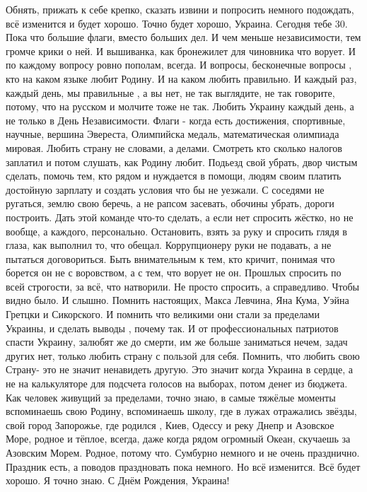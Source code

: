 \obeycr
Обнять, прижать к себе крепко, сказать извини и попросить немного подождать, всё изменится и будет хорошо. 
Точно будет хорошо, Украина. 
Сегодня тебе 30. 
Пока что большие флаги, вместо больших дел.
И чем меньше независимости, тем громче крики о ней. 
И вышиванка, как бронежилет для чиновника что ворует. 
И по каждому вопросу ровно пополам, всегда. 
И вопросы, бесконечные вопросы , кто на каком языке любит Родину. 
И на каком любить правильно. 
И каждый раз, каждый день, мы правильные , а вы нет, не так выглядите, не так говорите, потому, что на русском и молчите тоже не так. 
Любить Украину каждый день, а не только в День Независимости. 
Флаги - когда есть достижения, спортивные, научные, вершина Эвереста, Олимпийска медаль, математическая олимпиада мировая. 
Любить страну не словами, а делами. 
Смотреть кто сколько налогов заплатил и потом слушать, как Родину любит. 
Подьезд свой убрать, двор чистым сделать, помочь тем, кто рядом и нуждается в помощи, людям своим платить достойную зарплату и создать условия что бы не уезжали. 
С соседями не ругаться, землю свою беречь, а не рапсом засевать, обочины убрать, дороги построить. 
Дать этой команде что-то сделать, а если нет спросить жёстко, но не вообще, а каждого, персонально. 
Остановить, взять за руку и спросить глядя в глаза, как выполнил то, что обещал. 
Коррупционеру руки не подавать, а не пытаться договориться. 
Быть внимательным к тем, кто кричит, понимая что борется он не с воровством, а с тем, что ворует не он. 
Прошлых спросить по всей строгости, за всё, что натворили. 
Не просто спросить, а справедливо. Чтобы видно было. И слышно. 
Помнить настоящих, Макса Левчина, Яна Кума, Уэйна Гретцки и Сикорского. 
И помнить что великими они стали за пределами Украины, и сделать выводы , почему так. 
И от профессиональных патриотов спасти Украину, залюбят же до смерти, им же больше заниматься нечем, задач других нет, только любить страну с пользой для себя. 
Помнить, что любить свою Страну- это не значит ненавидеть другую. 
Это значит когда Украина в сердце, а не на калькуляторе для подсчета голосов на выборах, потом денег из бюджета. 
Как человек живущий за пределами, точно знаю, в самые тяжёлые моменты вспоминаешь свою Родину, вспоминаешь школу, где в лужах отражались звёзды, свой город Запорожье, где родился , Киев, Одессу и реку Днепр и Азовское Море, родное и тёплое, всегда, даже когда рядом огромный Океан, скучаешь за Азовским Морем. 
Родное, потому что. 
Сумбурно немного и не очень празднично. 
Праздник есть, а поводов праздновать пока немного. 
Но всё изменится. 
Всё будет хорошо. 
Я точно знаю. 
С Днём Рождения, Украина!
\restorecr
